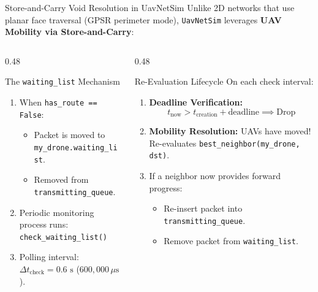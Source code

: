 \documentclass[aspectratio=169,10pt]{beamer}
\begin{document}
\begin{frame}{Store-and-Carry Void Resolution in UavNetSim}
  Unlike 2D networks that use planar face traversal (GPSR perimeter mode), \texttt{UavNetSim} leverages \textbf{UAV Mobility via Store-and-Carry}:

  \vspace{0.4em}
  \begin{columns}[T]
    \begin{column}{0.48\textwidth}
      \begin{block}{The \texttt{waiting\_list} Mechanism}
        \small
        \begin{enumerate}\setlength{\itemsep}{0.3em}
          \item When \texttt{has\_route == False}:
            \begin{itemize}\setlength{\itemsep}{0.15em}
              \item Packet is moved to \texttt{my\_drone.waiting\_list}.
              \item Removed from \texttt{transmitting\_queue}.
            \end{itemize}
          \item Periodic monitoring process runs:
            \texttt{check\_waiting\_list()}
          \item Polling interval: $\Delta t_{\text{check}} = 0.6\text{ s}$ ($600,000\,\mu\text{s}$).
        \end{enumerate}
      \end{block}
    \end{column}

    \begin{column}{0.48\textwidth}
      \begin{block}{Re-Evaluation Lifecycle}
        \small
        On each check interval:
        \begin{enumerate}\setlength{\itemsep}{0.3em}
          \item \textbf{Deadline Verification:}
            \begin{equation*}
              t_{\text{now}} > t_{\text{creation}} + \text{deadline} \implies \text{Drop}
            \end{equation*}
          \item \textbf{Mobility Resolution:}
            UAVs have moved! Re-evaluates \texttt{best\_neighbor(my\_drone, dst)}.
          \item If a neighbor now provides forward progress:
            \begin{itemize}\setlength{\itemsep}{0.15em}
              \item Re-insert packet into \texttt{transmitting\_queue}.
              \item Remove packet from \texttt{waiting\_list}.
            \end{itemize}
        \end{enumerate}
      \end{block}
    \end{column}
  \end{columns}
\end{frame}
\end{document}
